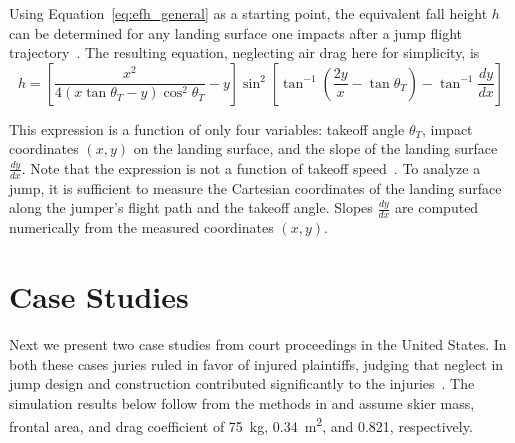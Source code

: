 \documentclass[smallextended]{svjour3}       %
\begin{document}
Using Equation~\ref{eq:efh_general} as a starting point, the equivalent fall
height $h$ can be determined for any landing surface one impacts after a jump
flight trajectory~\cite{Petrone2017}. The resulting equation, neglecting air
drag here for simplicity, is
%
\begin{equation}
  h = \left[\frac{x^2}{4(x\tan\theta_T - y)\cos^{2}\theta_T} -
    y\right]\sin^{2}\left[\tan^{-1}\left(\frac{2y}{x}- \tan\theta_T\right) -
    \tan^{-1}\frac{dy}{dx}\right]
  \label{eq:efh}
\end{equation}

This expression is  a function of only four variables: takeoff angle
$\theta_T$, impact coordinates $(x,y)$ on the landing surface, and the slope of
the landing surface $\frac{dy}{dx}$. Note that the expression is not a function
of takeoff speed~\cite{Petrone2017}. To analyze a jump, it is sufficient to
measure the Cartesian coordinates of the landing surface along the jumper's
flight path and the takeoff angle. Slopes $\frac{dy}{dx}$ are computed
numerically from the measured coordinates $(x,y)$.

\section{Case Studies}
\label{sec:case}
%
Next we present two case studies from court proceedings in the United States.
In both these cases juries ruled in favor of injured plaintiffs, judging that
neglect in jump design and construction contributed significantly to the
injuries~\cite{Alvarado2002,Salvini2008}. The simulation results below follow
from the methods in \cite{Levy2015} and assume skier mass, frontal area, and
drag coefficient of 75~\si{\kg}, 0.34~\si{\meter\squared}, and 0.821,
respectively.
\end{document}
